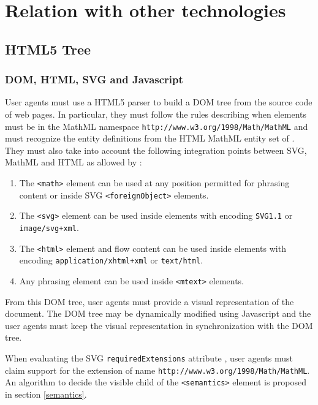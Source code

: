 \section{Relation with other technologies}

\subsection{HTML5 Tree}

\subsubsection{DOM, HTML, SVG and Javascript}

User agents must use a HTML5 \cite{HTML5} parser to build a DOM tree
\cite{DOM1} from the source code of web pages. In particular, they must follow
the rules describing when elements must be in the MathML namespace
{\tt http://www.w3.org/1998/Math/MathML} and must
recognize the entity definitions from the HTML MathML entity set of
\cite{XMLEntities}. They must also take into account the following integration
points between SVG, MathML and HTML as allowed by \cite{ValidatorSchemas}:

\begin{enumerate}
\item The {\tt <math>} element can be used at any position permitted for
  phrasing content or inside SVG {\tt <foreignObject>} elements.
\item The {\tt <svg>} element can be used inside {\tt <annotation-xml>}
  elements with encoding {\tt SVG1.1} or {\tt image/svg+xml}.
\item The {\tt <html>} element and flow content can be used inside
  {\tt <annotation-xml>} elements with encoding {\tt application/xhtml+xml}
  or {\tt text/html}.
\item Any phrasing element can be used inside {\tt <mtext>} elements.
\end{enumerate}

From this DOM tree, user agents must provide a visual representation of the
document. The DOM tree may be dynamically modified using Javascript
\cite{ECMA262} and the user agents must keep the visual representation in
synchronization with the DOM tree.

When evaluating the SVG {\tt requiredExtensions} attribute \cite{SVG11},
user agents must claim support for the extension of name
{\tt http://www.w3.org/1998/Math/MathML}.
An algorithm to decide the visible child of the {\tt <semantics>} element is
proposed in section \ref{semantics}.

